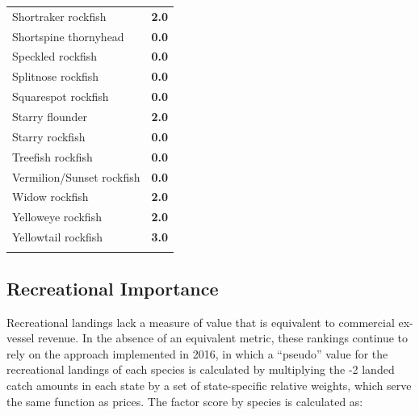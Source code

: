 \documentclass[11pt,
  english,
  a4paper,
]{article}
\begin{document}
\begin{longtable}[t]{>{\raggedright\arraybackslash}p{8cm}>{}c}
Shortraker rockfish & \textcolor[HTML]{66CB5D}{\textbf{2.0}}\\
Shortspine thornyhead & \textcolor[HTML]{35608D}{\textbf{0.0}}\\
Speckled rockfish & \textcolor[HTML]{35608D}{\textbf{0.0}}\\
Splitnose rockfish & \textcolor[HTML]{35608D}{\textbf{0.0}}\\
Squarespot rockfish & \textcolor[HTML]{35608D}{\textbf{0.0}}\\
Starry flounder & \textcolor[HTML]{66CB5D}{\textbf{2.0}}\\
Starry rockfish & \textcolor[HTML]{35608D}{\textbf{0.0}}\\
Treefish rockfish & \textcolor[HTML]{35608D}{\textbf{0.0}}\\
Vermilion/Sunset rockfish & \textcolor[HTML]{35608D}{\textbf{0.0}}\\
Widow rockfish & \textcolor[HTML]{66CB5D}{\textbf{2.0}}\\
Yelloweye rockfish & \textcolor[HTML]{66CB5D}{\textbf{2.0}}\\
Yellowtail rockfish & \textcolor[HTML]{FDE725}{\textbf{3.0}}\\*
\end{longtable}
\leavevmode\tagmcend\tagstructend\par
\endgroup{}
\endgroup{}


\hypertarget{recreational-importance}{%
\subsection{Recreational Importance}\label{recreational-importance}}

\leavevmode\tagmcend\tagstructend


Recreational landings lack a measure of value that is equivalent to commercial ex-vessel revenue. In the absence of an equivalent metric, these rankings continue to rely on the approach implemented in 2016, in which a ``pseudo'' value for the recreational landings of each species is calculated by multiplying the -2 landed catch amounts in each state by a set of state-specific relative weights, which serve the same function as prices. The factor score by species is calculated as:

\leavevmode\tagmcend\tagstructend\par
\end{document}
